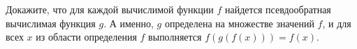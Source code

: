 Докажите, что для каждой вычислимой функции $f$ найдется псевдообратная вычислимая функция $g$. А именно,
$g$ определена на множестве значений $f$, и для всех $x$ из области определения $f$ выполняется
$f(g(f(x))) = f(x)$.